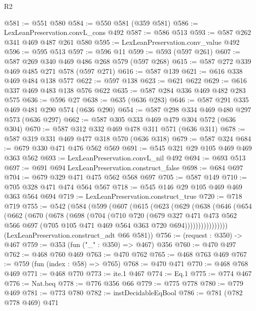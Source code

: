 \begin{lexlean}{R2}
\begin{coremodule}
@581 := @551 @580
@584 := @550 @581 (@359 @581)
@586 := LexLeanPreservation.convL_cons @492
@587 := @586 @513
@593 := @587 @262 @341 @469 @487 @261 @580
@595 := LexLeanPreservation.conv_value @492
@596 := @595 @513
@597 := @596 @11
@599 := @593 (@597 @261)
@607 := @587 @269 @340 @469 @486 @268 @579 (@597 @268)
@615 := @587 @272 @339 @469 @485 @271 @578 (@597 @271)
@616 := @587 @139
@621 := @616 @338 @469 @484 @138 @577
@622 := @597 @138
@623 := @621 @622
@629 := @616 @337 @469 @483 @138 @576 @622
@635 := @587 @284 @336 @469 @482 @283 @575
@636 := @596 @27
@638 := @635 (@636 @283)
@646 := @587 @291 @335 @469 @481 @290 @574 (@636 @290)
@654 := @587 @298 @334 @469 @480 @297 @573 (@636 @297)
@662 := @587 @305 @333 @469 @479 @304 @572 (@636 @304)
@670 := @587 @312 @332 @469 @478 @311 @571 (@636 @311)
@678 := @587 @319 @331 @469 @477 @318 @570 (@636 @318)
@679 := @587 @324
@684 := @679 @330 @471 @476 @562 @569
@691 := @545 @321 @29 @105 @469 @469 @363 @562
@693 := LexLeanPreservation.convL_nil @492
@694 := @693 @513
@697 := @691 @694 LexLeanPreservation.construct_false
@698 := @684 @697
@704 := @679 @329 @471 @475 @562 @568 @697
@705 := @587 @149
@710 := @705 @328 @471 @474 @564 @567
@718 := @545 @146 @29 @105 @469 @469 @363 @564 @694
@719 := LexLeanPreservation.construct_true
@720 := @718 @719
@755 := @542
    (@584
      (@599
        (@607
          (@615
            (@623
              (@629
                (@638
                  (@646
                    (@654
                      (@662
                        (@670
                          (@678
                            (@698
                              (@704
                                (@710
                                  @720
                                  (@679
                                    @327
                                    @471
                                    @473
                                    @562
                                    @566
                                    @697
                                    (@705 @105 @471 @469 @564 @363 @720 @694))))))))))))))))
      (LexLeanPreservation.construct_adt @66 @581))
@756 := (request : @350) -> @467
@759 := @353 (fun ("_" : @350) => @467) @356
@760 := @470 @497
@762 := @468 @760 @469
@763 := @470 @762
@765 := @468 @763 @469
@767 := @759 (fun (index : @58) => @765)
@768 := @470 @471
@770 := @468 @768 @469
@771 := @468 @770
@773 := ite.{1} @467
@774 := Eq.{1}
@775 := @774 @467
@776 := Nat.beq
@778 := @776 @356 @66
@779 := @775 @778
@780 := @779 @469
@781 := @773 @780
@782 := instDecidableEqBool
@786 := @781 (@782 @778 @469) @471

\end{coremodule}
\end{lexlean}
